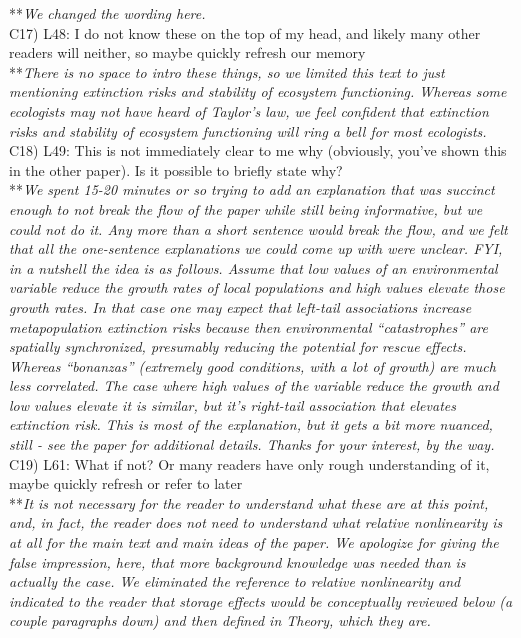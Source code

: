 \documentclass[letterpaper,11pt]{article}
\begin{document}
\noindent ***\emph{We changed the wording here.} \\

\noindent C17) L48: I do not know these on the top of my head, and likely many other readers will neither, so maybe quickly refresh our memory \\

\noindent ***\emph{There is no space to intro these things, so we limited this text to just mentioning 
extinction risks and stability of ecosystem functioning. Whereas some ecologists may not have heard of 
Taylor's law, we feel confident that extinction risks and stability of ecosystem functioning will ring
a bell for most ecologists.} \\

\noindent C18) L49: This is not immediately clear to me why (obviously, you’ve shown this in the other paper). Is it possible to briefly state why? \\

\noindent ***\emph{We spent 15-20 minutes or so trying to add an explanation that was succinct enough to not break
the flow of the paper while still being informative, but we could not do it. Any more than a short sentence would break the 
flow, and we felt that all the one-sentence explanations we could come up with were unclear. 
FYI, in a nutshell the idea is as follows. Assume that low values of an environmental variable reduce the 
growth rates of local populations and high values elevate those growth rates. In that case one may
expect that left-tail associations increase metapopulation extinction risks because then environmental
``catastrophes'' are spatially synchronized, presumably reducing the potential for rescue effects. Whereas
``bonanzas'' (extremely good conditions, with a lot of growth) are much less correlated. The case where
high values of the variable reduce the growth and low values elevate it is similar, but it's right-tail association
that elevates extinction risk. This is most of the explanation, but it gets a bit more nuanced, still - 
see the paper for additional details. Thanks for your interest, by the way.} \\

\noindent C19) L61: What if not? Or many readers have only rough understanding of it, maybe quickly refresh or refer to later \\

\noindent ***\emph{It is not necessary for the reader to understand what these are at this point, and,
in fact, the reader does not need to understand what relative nonlinearity is at all for the main text
and main ideas of the paper. We apologize for giving the false impression, here, that more background knowledge was needed
than is actually the case. We eliminated the reference to relative nonlinearity and indicated to the 
reader that storage effects would be conceptually reviewed below (a couple paragraphs down) and then 
defined in Theory, which they are.} \\
\end{document}
